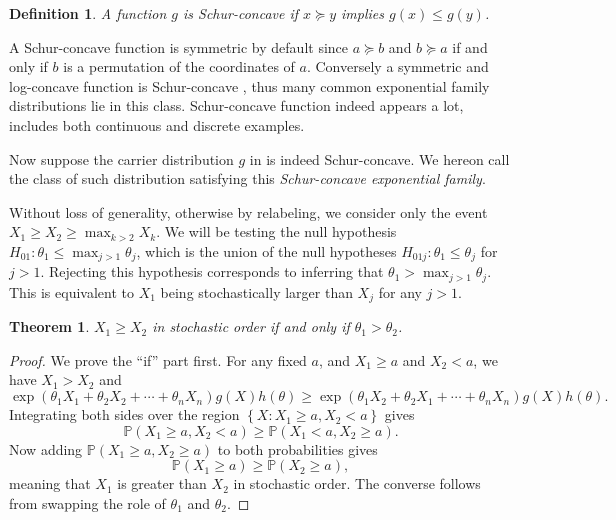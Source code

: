 \documentclass[11pt]{article}
\newtheorem{definition}{Definition}
\newtheorem{theorem}{Theorem}
\newcommand{\PP}{\mathbb{P}}
\begin{document}
\begin{definition}
A function $g$ is Schur-concave if $x \succeq y$ implies $g\left(x\right) \le g\left(y\right)$.
\end{definition}

A Schur-concave function is symmetric by default since $a \succeq b$ and $b \succeq a$ if and only if $b$ is a permutation of the coordinates of $a$. Conversely a symmetric and log-concave function is Schur-concave \cite{Marshall:2010hb}, thus many common exponential family distributions lie in this class. Schur-concave function indeed appears a lot,  includes both continuous and discrete examples.

Now suppose the carrier distribution $g$ in  is indeed Schur-concave. We hereon call the class of such distribution satisfying this {\em Schur-concave exponential family}.

Without loss of generality, otherwise by relabeling, we consider only the event $X_1 \ge X_2 \ge \max_{k > 2} X_k$. We will be testing the null hypothesis $H_{01}: \theta_1 \le \max_{j > 1} \theta_j$, which is the union of the null hypotheses $H_{01j}: \theta_1 \le \theta_j$ for $j > 1$. Rejecting this hypothesis corresponds to inferring that $\theta_1 > \max_{j>1} \theta_j$. This is equivalent to $X_1$ being stochastically larger than $X_j$ for any $j > 1$.

\begin{theorem}
\label{thm:stoch}
$X_1 \ge X_2$ in stochastic order if and only if $\theta_1 > \theta_2$.
\end{theorem}

\begin{proof}

We prove the ``if'' part first. For any fixed $a$, and $X_1 \ge a$ and $X_2 < a$, we have $X_1 > X_2$ and
$$\exp\left(\theta_1 X_1 + \theta_2 X_2 + \cdots + \theta_n X_n\right) g\left(X\right) h\left(\theta\right) \ge \exp\left(\theta_1 X_2 + \theta_2 X_1 + \cdots + \theta_n X_n\right) g\left(X\right) h\left(\theta\right).$$
Integrating both sides over the region $\left\{X: X_1 \ge a, X_2 < a\right\}$ gives
$$\PP\left(X_1 \ge a, X_2 < a\right) \ge \PP\left(X_1 < a, X_2 \ge a\right).$$
Now adding $\PP\left(X_1 \ge a, X_2 \ge a\right)$ to both probabilities gives
$$\PP\left(X_1 \ge a\right) \ge \PP\left(X_2 \ge a\right),$$
meaning that $X_1$ is greater than $X_2$ in stochastic order. The converse follows from swapping the role of $\theta_1$ and $\theta_2$.

\end{proof}
\end{document}
